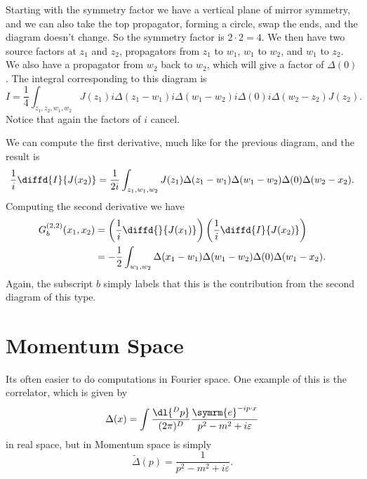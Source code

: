 \documentclass[fleqn]{NotesClass}
\newcommand{\e}{\symrm{e}}
\begin{document}
    Starting with the symmetry factor we have a vertical plane of mirror symmetry, and we can also take the top propagator, forming a circle, swap the ends, and the diagram doesn't change.
    So the symmetry factor is \(2 \cdot 2 = 4\).
    We then have two source factors at \(z_1\) and \(z_2\), propagators from \(z_1\) to \(w_1\), \(w_1\) to \(w_2\), and \(w_1\) to \(z_2\).
    We also have a propagator from \(w_2\) back to \(w_2\), which will give a factor of \(\Delta(0)\).
    The integral corresponding to this diagram is
    \begin{equation}
        I = \frac{1}{4} \int_{z_1,z_2,w_1,w_2} J(z_1) i\Delta(z_1 - w_1) i\Delta(w_1 - w_2) i\Delta(0) i\Delta(w_2 - z_2) J(z_2).
    \end{equation}
    Notice that again the factors of \(i\) cancel.
    
    We can compute the first derivative, much like for the previous diagram, and the result is
    \begin{equation}
        \frac{1}{i} \diffd{I}{J(x_2)} = \frac{1}{2i} \int_{z_1,w_1,w_2} J(z_1)\Delta(z_1 - w_1) \Delta(w_1 - w_2)\Delta(0)\Delta(w_2 - x_2).
    \end{equation}
    Computing the second derivative we have
    \begin{align}
        G^{(2,2)}_b(x_1, x_2) &= \left( \frac{1}{i} \diffd{}{J(x_1)} \right) \left( \frac{1}{i} \diffd{I}{J(x_2)} \right)\\
        &= -\frac{1}{2} \int_{w_1, w_2} \Delta(x_1 - w_1) \Delta(w_1 - w_2) \Delta(0) \Delta(w_1 - x_2).
    \end{align}
    Again, the subscript \(b\) simply labels that this is the contribution from the second diagram of this type.
    
    \section{Momentum Space}
    Its often easier to do computations in Fourier space.
    One example of this is the correlator, which is given by
    \begin{equation}
        \Delta(x) = \int \frac{\dl{^Dp}}{(2\pi)^D} \frac{\e^{-ip\cdot x}}{p^2 - m^2 + i\varepsilon}
    \end{equation}
    in real space, but in Momentum space is simply
    \begin{equation}
        \tilde{\Delta}(p) = \frac{1}{p^2 - m^2 + i\varepsilon}.
    \end{equation}
    
\end{document}
